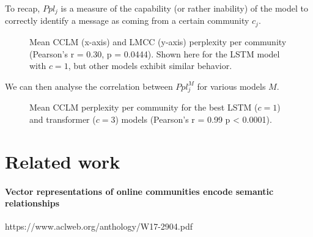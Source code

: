 \documentclass[11pt,a4paper]{article}
\begin{document}
To recap, \(Ppl_j\) is a measure of the capability (or rather
inability) of the model to correctly identify a message as coming from
a certain community $c_j$. 


\begin{figure}
  \caption{%
    Mean CCLM (x-axis) and LMCC (y-axis) perplexity per community (Pearson's r = \num{0.30}, p = \num{0.0444}).
    Shown here for the LSTM model with $c = 1$, but other models exhibit similar behavior.
  }
  \label{fig:cclm_lmcc_ppl}
\end{figure}


We can then analyse the correlation between \(Ppl^M_j\) for various models $M$.

\begin{figure}
  \caption{%
    Mean CCLM perplexity per community for the best LSTM ($c = 1$) and transformer ($c = 3$) models
    (Pearson's r = \num{0.99} p < \num{0.0001}).
  }
  \label{fig:lmcc_ppl}
\end{figure}





\section{Related work}

\paragraph{Vector representations of online communities encode semantic relationships}
https://www.aclweb.org/anthology/W17-2904.pdf
\end{document}
